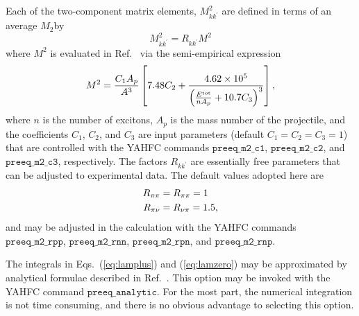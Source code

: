 \documentclass[
10pt,
showpacs,preprintnumbers,footinbib,
amsfonts,amsmath,amssymb,
aps,
prc,twocolumn,groupedaddress,superscriptaddress,
showkeys,
nofootinbib
]{revtex4-1}
\begin{document}
\begin{widetext}
Each of the two-component matrix elements, $M_{kk^\prime}^2$ are defined in terms of an average $M_2$by
\begin{equation}
M_{kk^\prime}^2 = R_{kk^\prime} M^2
\end{equation}
where $M^2$ is evaluated in Ref.~\cite{TALYS} via the semi-empirical expression
\begin{equation}
M^2 = \frac{C_1A_p}{A^3}\left [ 7.48 C_2 + \frac{4.62\times 10^5}{\left ( \frac{E^{\rm tot}}{nA_p} + 10.7 C_3 \right )^3} \right ],
\end{equation}
where $n$ is the number of excitons, $A_p$ is the mass number of the projectile, and the coefficients $C_1$, $C_2$, and $C_3$
are input parameters (default $C_1 = C_2 = C_3 = 1$) that are controlled with the YAHFC commands ${\texttt{preeq\_m2\_c1}}$,
${\texttt{preeq\_m2\_c2}}$, and ${\texttt{preeq\_m2\_c3}}$, respectively. The factors $R_{kk^\prime}$ are essentially free parameters that can be adjusted to
experimental data. The default values adopted here are
\begin{align}
R_{\pi\pi} &= R_{\pi\pi} = 1 \notag \\
R_{\pi\nu} &= R_{\nu\pi} = 1.5,
\end{align}
and may be adjusted in the calculation with the YAHFC commands ${\texttt{preeq\_m2\_rpp}}$, ${\texttt{preeq\_m2\_rnn}}$, ${\texttt{preeq\_m2\_rpn}}$, and
${\texttt{preeq\_m2\_rnp}}$.

The integrals in Eqs.~(\ref{eq:lamplus}) and (\ref{eq:lamzero}) may be approximated by analytical formulae described in Ref.~\cite{Kalbach:1985}. This option may be invoked with the YAHFC command ${\texttt{preeq\_analytic}}$. For the most part, the numerical integration is
not time consuming, and there is no obvious advantage to selecting this option.


\end{widetext}
\end{document}
